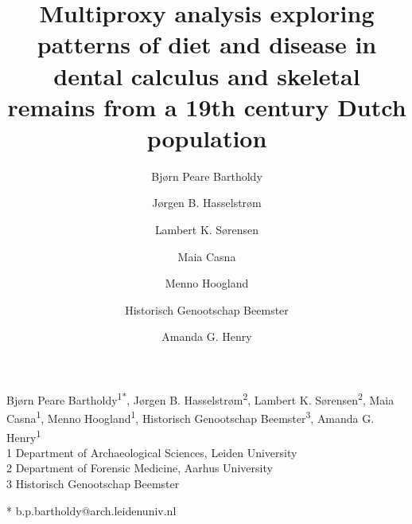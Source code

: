 \documentclass[
]{article}
\title{Multiproxy analysis exploring patterns of diet and disease in
dental calculus and skeletal remains from a 19th century Dutch
population}
\author{Bjørn Peare Bartholdy \and Jørgen B. Hasselstrøm \and Lambert K.
Sørensen \and Maia Casna \and Menno Hoogland \and Historisch Genootschap
Beemster \and Amanda G. Henry}
\date{}
\begin{document}
\begin{flushleft}
{\LARGE
\textbf{}
}
\newline

\vspace{12pt}

\normalsize{Bjørn Peare
Bartholdy}\textsuperscript{1*}, \normalsize{Jørgen B.
Hasselstrøm}\textsuperscript{2}, \normalsize{Lambert K.
Sørensen}\textsuperscript{2}, \normalsize{Maia
Casna}\textsuperscript{1}, \normalsize{Menno
Hoogland}\textsuperscript{1}, \normalsize{Historisch Genootschap
Beemster}\textsuperscript{3}, \normalsize{Amanda G.
Henry}\textsuperscript{1}
\\
\bigskip
\small{1} \small{Department of Archaeological Sciences, Leiden
University}\\ \small{2} \small{Department of Forensic Medicine, Aarhus
University}\\ \small{3} \small{Historisch Genootschap Beemster}
\newline

* b.p.bartholdy@arch.leidenuniv.nl

\end{flushleft}

\linenumbers
\end{document}
